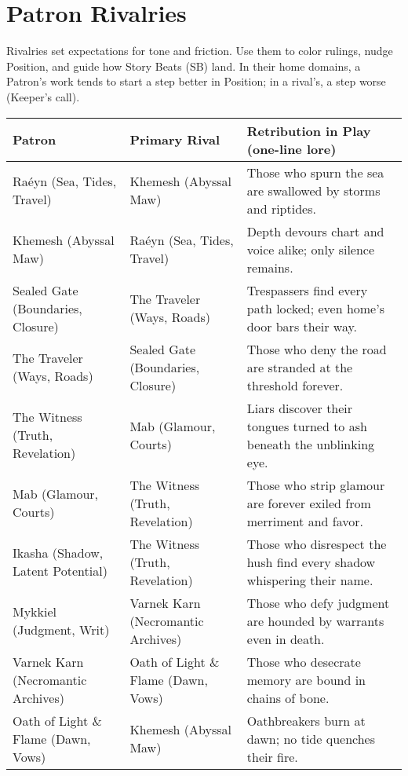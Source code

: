 \section{Patron Rivalries}
\label{sec:patron-rivalries}

Rivalries set expectations for tone and friction. Use them to color rulings, nudge Position, and guide how Story Beats (SB) land. In their home domains, a Patron’s work tends to start a step better in Position; in a rival’s, a step worse (Keeper’s call).

\begin{table}[h!]
  \centering
  \renewcommand{\arraystretch}{1.15}
  \begin{tabular}{@{}p{3.4cm}p{3.4cm}p{8.2cm}@{}}
    \toprule
    \textbf{Patron} & \textbf{Primary Rival} & \textbf{Retribution in Play (one-line lore)} \\
    \midrule
    Raéyn (Sea, Tides, Travel) & Khemesh (Abyssal Maw) & Those who spurn the sea are swallowed by storms and riptides. \\
    Khemesh (Abyssal Maw) & Raéyn (Sea, Tides, Travel) & Depth devours chart and voice alike; only silence remains. \\
    Sealed Gate (Boundaries, Closure) & The Traveler (Ways, Roads) & Trespassers find every path locked; even home’s door bars their way. \\
    The Traveler (Ways, Roads) & Sealed Gate (Boundaries, Closure) & Those who deny the road are stranded at the threshold forever. \\
    The Witness (Truth, Revelation) & Mab (Glamour, Courts) & Liars discover their tongues turned to ash beneath the unblinking eye. \\
    Mab (Glamour, Courts) & The Witness (Truth, Revelation) & Those who strip glamour are forever exiled from merriment and favor. \\
    Ikasha (Shadow, Latent Potential) & The Witness (Truth, Revelation) & Those who disrespect the hush find every shadow whispering their name. \\
    Mykkiel (Judgment, Writ) & Varnek Karn (Necromantic Archives) & Those who defy judgment are hounded by warrants even in death. \\
    Varnek Karn (Necromantic Archives) & Oath of Light \& Flame (Dawn, Vows) & Those who desecrate memory are bound in chains of bone. \\
    Oath of Light \& Flame (Dawn, Vows) & Khemesh (Abyssal Maw) & Oathbreakers burn at dawn; no tide quenches their fire. \\

\end{tabular}
\end{table}
